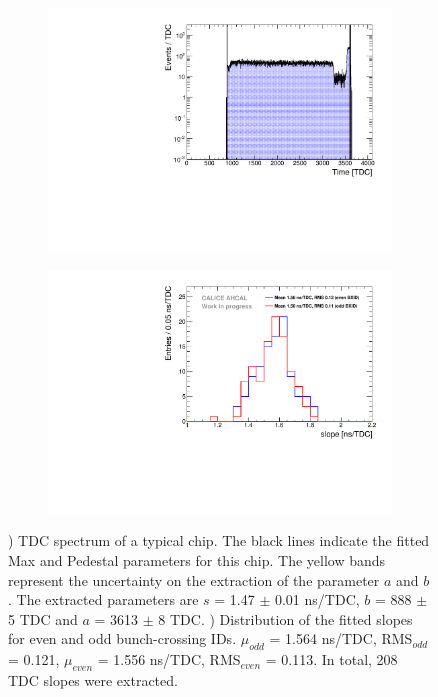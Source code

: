 \begin{figure}[htbp!]
	\begin{subfigure}[t]{0.49\textwidth}
		\centering
		\includegraphics[width=1\linewidth]{fig/ExampleTDCSpectra.pdf}
		\caption{} \label{fig:TDC_Spectrum}
	\end{subfigure}
	\hfill
	\begin{subfigure}[t]{0.49\textwidth}
		\centering
		\includegraphics[width=1\linewidth]{fig/SlopesTDC.pdf}
		\caption{} \label{fig:slopes}
	\end{subfigure}
	\caption{) TDC spectrum of a typical chip. The black lines indicate the fitted Max and Pedestal parameters for this chip. The yellow bands represent the uncertainty on the extraction of the parameter $a$ and $b$. The extracted parameters are $s$ = 1.47 $\pm$ 0.01 ns/TDC, $b$ = 888 $\pm$ 5 TDC and $a$ = 3613 $\pm$ 8 TDC. ) Distribution of the fitted slopes for even and odd bunch-crossing IDs. $\mu_{odd}$ = 1.564 ns/TDC, RMS$_{odd}$ = 0.121, $\mu_{even}$ = 1.556 ns/TDC, RMS$_{even}$ = 0.113. In total, 208 TDC slopes were extracted.}
\end{figure}

